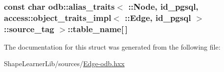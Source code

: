 \subsubsection[{table\+\_\+name}]{\setlength{\rightskip}{0pt plus 5cm}const char odb\+::alias\+\_\+traits$<$ \+::{\bf Node}, id\+\_\+pgsql, access\+::object\+\_\+traits\+\_\+impl$<$ \+::{\bf Edge}, id\+\_\+pgsql $>$\+::source\+\_\+tag $>$\+::table\+\_\+name\mbox{[}$\,$\mbox{]}\hspace{0.3cm}{\ttfamily [static]}}\label{structodb_1_1alias__traits_3_01_1_1_node_00_01id__pgsql_00_01access_1_1object__traits__impl_3_01db58b174ecb0ad95fbb7b688e9500987_a0201ddf009a497b04811e26b75ee897f}


The documentation for this struct was generated from the following file\+:\begin{DoxyCompactItemize}
\item 
Shape\+Learner\+Lib/sources/\hyperlink{_edge-odb_8hxx}{Edge-\/odb.\+hxx}\end{DoxyCompactItemize}
